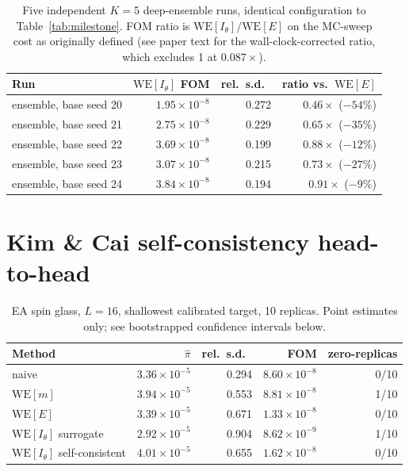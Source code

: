 \documentclass[11pt]{article}
\begin{document}
\begin{table}[h]
	\centering\small
	\caption{Five independent $K{=}5$ deep-ensemble runs, identical configuration to
		Table~\ref{tab:milestone}. FOM ratio is $\mathrm{WE}[I_\theta]/\mathrm{WE}[E]$ on the
		MC-sweep cost as originally defined (see paper text for the wall-clock-corrected ratio,
		which excludes 1 at $0.087\times$).}
	\label{tab:ensemble}
	\begin{tabular}{lrrr}
		\toprule
		Run & $\mathrm{WE}[I_\theta]$ FOM & rel.\ s.d.\ & ratio vs.\ $\mathrm{WE}[E]$ \\
		\midrule
		ensemble, base seed 20 & $1.95\times10^{-8}$ & 0.272 & $0.46\times$ ($-54\%$) \\
		ensemble, base seed 21 & $2.75\times10^{-8}$ & 0.229 & $0.65\times$ ($-35\%$) \\
		ensemble, base seed 22 & $3.69\times10^{-8}$ & 0.199 & $0.88\times$ ($-12\%$) \\
		ensemble, base seed 23 & $3.07\times10^{-8}$ & 0.215 & $0.73\times$ ($-27\%$) \\
		ensemble, base seed 24 & $3.84\times10^{-8}$ & 0.194 & $0.91\times$ ($-9\%$) \\
		\bottomrule
	\end{tabular}
\end{table}

\section{Kim \& Cai self-consistency head-to-head}

\begin{table}[h]
	\centering\small
	\caption{EA spin glass, $L=16$, shallowest calibrated target, 10 replicas. Point estimates
		only; see bootstrapped confidence intervals below.}
	\label{tab:kimcai}
	\begin{tabular}{lrrrr}
		\toprule
		Method & $\hat\pi$ & rel.\ s.d.\ & FOM & zero-replicas \\
		\midrule
		naive & $3.36\times10^{-5}$ & 0.294 & $8.60\times10^{-8}$ & 0/10 \\
		$\mathrm{WE}[m]$ & $3.94\times10^{-5}$ & 0.553 & $8.81\times10^{-8}$ & 1/10 \\
		$\mathrm{WE}[E]$ & $3.39\times10^{-5}$ & 0.671 & $1.33\times10^{-8}$ & 0/10 \\
		$\mathrm{WE}[I_\theta]$ surrogate & $2.92\times10^{-5}$ & 0.904 & $8.62\times10^{-9}$ & 1/10 \\
		$\mathrm{WE}[I_\theta]$ self-consistent & $4.01\times10^{-5}$ & 0.655 &
		$1.62\times10^{-8}$ & 0/10 \\
		\bottomrule
	\end{tabular}
\end{table}
\end{document}
